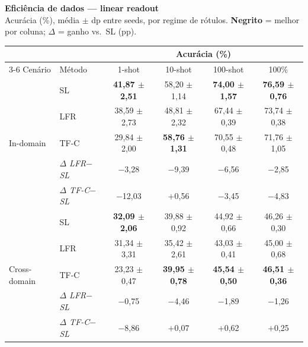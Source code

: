 \documentclass[border=8pt,varwidth=\maxdimen]{standalone}
\begin{document}
\centering
{\large\bfseries Eficiência de dados — linear readout}\\[2pt]
{\scriptsize Acurácia (\%), média $\pm$ dp entre seeds, por regime de rótulos. \textbf{Negrito} = melhor por coluna; $\Delta$ = ganho vs.\ SL (pp).}\\[6pt]
\begin{tabular}{llcccc}
\toprule
& & \multicolumn{4}{c}{Acurácia (\%)}\\
\cmidrule(lr){3-6}
Cenário & Método & 1-shot & 10-shot & 100-shot & 100\%\\
\midrule
\multirow{5}{*}{In-domain}
 & SL        & \textbf{41{,}87 $\pm$ 2{,}51} & 58{,}20 $\pm$ 1{,}14 & \textbf{74{,}00 $\pm$ 1{,}57} & \textbf{76{,}59 $\pm$ 0{,}76}\\
 & LFR       & 38{,}59 $\pm$ 2{,}73 & 48{,}81 $\pm$ 2{,}32 & 67{,}44 $\pm$ 0{,}39 & 73{,}74 $\pm$ 0{,}38\\
 & TF-C      & 29{,}84 $\pm$ 2{,}00 & \textbf{58{,}76 $\pm$ 1{,}31} & 70{,}55 $\pm$ 0{,}48 & 71{,}76 $\pm$ 1{,}05\\
\cmidrule(lr){2-6}
 & \textit{$\Delta$ LFR$-$SL} & $-$3{,}28 & $-$9{,}39 & $-$6{,}56 & $-$2{,}85\\
 & \textit{$\Delta$ TF-C$-$SL} & $-$12{,}03 & $+$0{,}56 & $-$3{,}45 & $-$4{,}83\\
\midrule
\multirow{5}{*}{Cross-domain}
 & SL        & \textbf{32{,}09 $\pm$ 2{,}06} & 39{,}88 $\pm$ 0{,}92 & 44{,}92 $\pm$ 0{,}66 & 46{,}26 $\pm$ 0{,}30\\
 & LFR       & 31{,}34 $\pm$ 3{,}31 & 35{,}42 $\pm$ 2{,}61 & 43{,}03 $\pm$ 0{,}41 & 45{,}00 $\pm$ 0{,}68\\
 & TF-C      & 23{,}23 $\pm$ 0{,}47 & \textbf{39{,}95 $\pm$ 0{,}78} & \textbf{45{,}54 $\pm$ 0{,}50} & \textbf{46{,}51 $\pm$ 0{,}36}\\
\cmidrule(lr){2-6}
 & \textit{$\Delta$ LFR$-$SL} & $-$0{,}75 & $-$4{,}46 & $-$1{,}89 & $-$1{,}26\\
 & \textit{$\Delta$ TF-C$-$SL} & $-$8{,}86 & $+$0{,}07 & $+$0{,}62 & $+$0{,}25\\
\bottomrule
\end{tabular}
\end{document}
